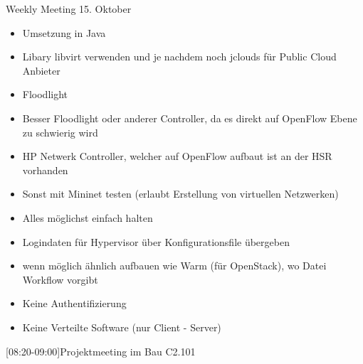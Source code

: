 \begin{Protokoll}{Weekly Meeting 15. Oktober}
\protokollKopf

\begin{itemize}
  \item Umsetzung in Java
  \item Libary libvirt verwenden und je nachdem noch jclouds für Public Cloud 
  Anbieter
\end{itemize}

\begin{itemize}
  \item Floodlight
  \item Besser Floodlight oder anderer Controller, da es direkt auf OpenFlow Ebene zu schwierig wird
  \item HP Netwerk Controller, welcher auf OpenFlow aufbaut ist an der HSR 
  vorhanden
  \item Sonst mit Mininet testen (erlaubt Erstellung von virtuellen Netzwerken) 
\end{itemize}

\begin{itemize}
  \item Alles möglichst einfach halten
  \item Logindaten für Hypervisor über Konfigurationsfile übergeben
\end{itemize}

\begin{itemize}
  \item wenn möglich ähnlich aufbauen wie Warm (für OpenStack), wo Datei 
  Workflow vorgibt
\end{itemize}

\begin{itemize}
	\item Keine Authentifizierung
	\item Keine Verteilte Software (nur Client - Server)
\end{itemize}

[08:20-09:00]{Projektmeeting im Bau C2.101}

\end{Protokoll}
